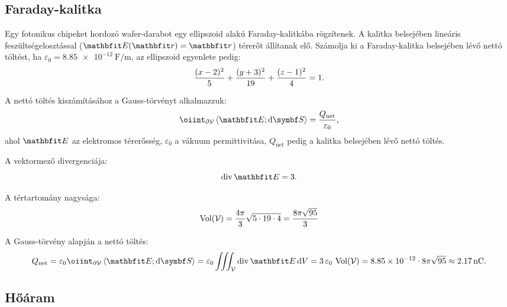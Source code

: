 \documentclass{szb-solution}
\begin{document}
\subsection{Faraday-kalitka}

Egy fotonikus chipeket hordozó wafer-darabot egy ellipszoid alakú
Faraday-kalitkába rögzítenek. A kalitka belsejében lineáris
feszültségelosztással ($\rvec E(\coordv) = \coordv$) térerőt állítanak
elő. Számolja ki a Faraday-kalitka belsejében lévő nettó töltést, ha
$\varepsilon_0 = \SI[per-mode=symbol]{8,85e-12}{\farad\per\meter}$,
az ellipszoid egyenlete pedig:
$$
  \frac{(x - 2)^2}{5} + \frac{(y + 3)^2}{19} + \frac{(z - 1)^2}{4} = 1
  \text.
$$

A nettó töltés kiszámításához a Gauss-törvényt alkalmazzuk:
$$
  \oiint_{\partial \volimage} \scalar{\rvec E}{\dd \surfvec}
  = \frac{Q_{\text{net}}}{\varepsilon_0}
  \text,
$$
ahol $\rvec E$ az elektromos térerősség, $\varepsilon_0$ a vákuum
permittivitása, $Q_{\text{net}}$ pedig a kalitka belsejében lévő nettó töltés.

A vektormező divergenciája:
$$
  \Div \rvec E = 3
  \text.
$$

A tértartomány nagysága:
$$
  \operatorname{Vol}(\mathcal{V})
  = \frac{4\pi}{3} \sqrt{5 \cdot 19 \cdot 4}
  = \frac{8\pi \sqrt{95}}{3}
$$

A Gauss-törvény alapján a nettó töltés:
$$
  Q_{\text{net}}
  = \varepsilon_0 \oiint_{\partial \volimage} \scalar{\rvec E}{\dd \surfvec}
  = \varepsilon_0 \iiint_{\volimage} \Div \rvec E \dd \volscalar
  = 3 \, \varepsilon_0 \, \operatorname{Vol}(\volimage)
  = \SI[per-mode=symbol]{8,85e-12}{} \cdot 8 \pi \sqrt{95}
  \approx \SI{2,17}{\nano\coulomb}
  \text.
$$

\subsection{Hőáram}
\end{document}
